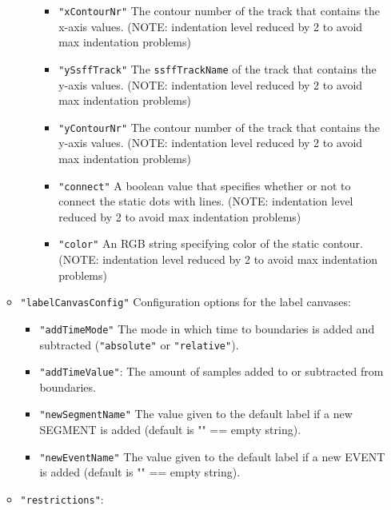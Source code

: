 \documentclass[]{book}
\begin{document}
\begin{itemize}
\begin{itemize}
\begin{itemize}
\begin{itemize}
      \item
        \texttt{"xContourNr"} The contour number of the track that contains the x-axis values. (NOTE: indentation level reduced by 2 to avoid max indentation problems)
      \item
        \texttt{"ySsffTrack"} The \texttt{ssffTrackName} of the track that contains the y-axis values. (NOTE: indentation level reduced by 2 to avoid max indentation problems)
      \item
        \texttt{"yContourNr"} The contour number of the track that contains the y-axis values. (NOTE: indentation level reduced by 2 to avoid max indentation problems)
      \item
        \texttt{"connect"} A boolean value that specifies whether or not to connect the static dots with lines. (NOTE: indentation level reduced by 2 to avoid max indentation problems)
      \item
        \texttt{"color"} An RGB string specifying color of the static contour. (NOTE: indentation level reduced by 2 to avoid max indentation problems)
      \end{itemize}
    \end{itemize}
  \item
    \texttt{"labelCanvasConfig"} Configuration options for the label
    canvases:

    \begin{itemize}
    \item
      \texttt{"addTimeMode"} The mode in which time to boundaries is
      added and subtracted (\texttt{"absolute"} or \texttt{"relative"}).
    \item
      \texttt{"addTimeValue"}: The amount of samples added to or
      subtracted from boundaries.
    \item
      \texttt{"newSegmentName"} The value given to the default label if a
      new SEGMENT is added (default is "" == empty string).
    \item
      \texttt{"newEventName"} The value given to the default label if a
      new EVENT is added (default is "" == empty string).
    \end{itemize}
  \item
    \texttt{"restrictions"}:


\end{itemize}
\end{itemize}
\end{document}
